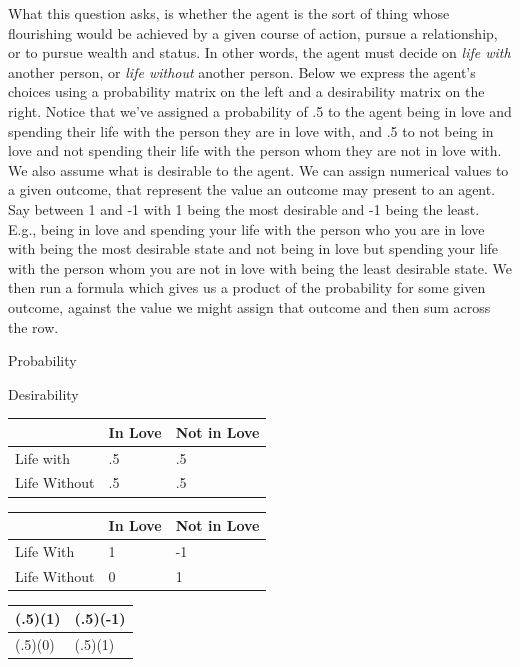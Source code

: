 \documentclass[
  letterpaper,
  DIV=11,
  numbers=noendperiod]{scrartcl}
\newcounter{none} %
\begin{document}
What this question asks, is whether the agent is the sort of thing whose
flourishing would be achieved by a given course of action, pursue a
relationship, or to pursue wealth and status. In other words, the agent
must decide on \emph{life with} another person, or \emph{life without}
another person. Below we express the agent's choices using a probability
matrix on the left and a desirability matrix on the right. Notice that
we've assigned a probability of .5 to the agent being in love and
spending their life with the person they are in love with, and .5 to not
being in love and not spending their life with the person whom they are
not in love with. We also assume what is desirable to the agent. We can
assign numerical values to a given outcome, that represent the value an
outcome may present to an agent. Say between 1 and -1 with 1 being the
most desirable and -1 being the least. E.g., being in love and spending
your life with the person who you are in love with being the most
desirable state and not being in love but spending your life with the
person whom you are not in love with being the least desirable state. We
then run a formula which gives us a product of the probability for some
given outcome, against the value we might assign that outcome and then
sum across the row.

Probability

Desirability

{\def\LTcaptype{none} %
\begin{longtable}[]{@{}lll@{}}
\toprule\noalign{}
& In Love & Not in Love \\
\midrule\noalign{}
\endhead
\bottomrule\noalign{}
\endlastfoot
Life with & .5 & .5 \\
Life Without & .5 & .5 \\
\end{longtable}
}

{\def\LTcaptype{none} %
\begin{longtable}[]{@{}lll@{}}
\toprule\noalign{}
& In Love & Not in Love \\
\midrule\noalign{}
\endhead
\bottomrule\noalign{}
\endlastfoot
Life With & 1 & -1 \\
Life Without & 0 & 1 \\
\end{longtable}
}

{\def\LTcaptype{none} %
\begin{longtable}[]{@{}ll@{}}
\toprule\noalign{}
(.5)(1) & (.5)(-1) \\
\midrule\noalign{}
\endhead
\bottomrule\noalign{}
\endlastfoot
(.5)(0) & (.5)(1) \\
\end{longtable}
}
\end{document}
